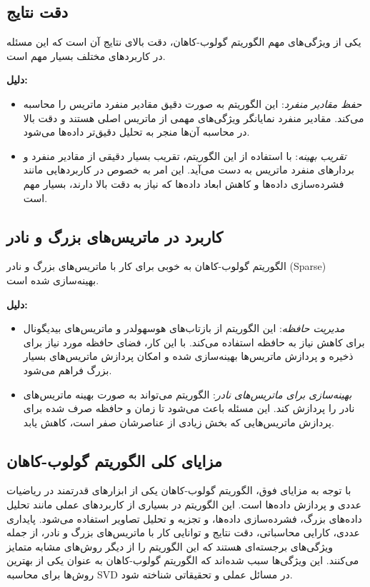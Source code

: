 \subsection{دقت نتایج}

یکی از ویژگی‌های مهم الگوریتم گولوب-کاهان، دقت بالای نتایج آن است که این مسئله در کاربردهای مختلف بسیار مهم است.

\textbf{دلیل:}

\begin{itemize}
  \item \textit{حفظ مقادیر منفرد}: این الگوریتم به صورت دقیق مقادیر منفرد ماتریس را محاسبه می‌کند. مقادیر منفرد نمایانگر ویژگی‌های مهمی از ماتریس اصلی هستند و دقت بالا در محاسبه آن‌ها منجر به تحلیل دقیق‌تر داده‌ها می‌شود.
  \item \textit{تقریب بهینه}: با استفاده از این الگوریتم، تقریب بسیار دقیقی از مقادیر منفرد و بردارهای منفرد ماتریس به دست می‌آید. این امر به خصوص در کاربردهایی مانند فشرده‌سازی داده‌ها و کاهش ابعاد داده‌ها که نیاز به دقت بالا دارند، بسیار مهم است.
\end{itemize}

\subsection{کاربرد در ماتریس‌های بزرگ و نادر}

الگوریتم گولوب-کاهان به خوبی برای کار با ماتریس‌های بزرگ و نادر (Sparse) بهینه‌سازی شده است.

\textbf{دلیل:}

\begin{itemize}
  \item \textit{مدیریت حافظه}: این الگوریتم از بازتاب‌های هوسهولدر و ماتریس‌های بیدیگونال برای کاهش نیاز به حافظه استفاده می‌کند. با این کار، فضای حافظه مورد نیاز برای ذخیره و پردازش ماتریس‌ها بهینه‌سازی شده و امکان پردازش ماتریس‌های بسیار بزرگ فراهم می‌شود.
  \item \textit{بهینه‌سازی برای ماتریس‌های نادر}: الگوریتم می‌تواند به صورت بهینه ماتریس‌های نادر را پردازش کند. این مسئله باعث می‌شود تا زمان و حافظه صرف شده برای پردازش ماتریس‌هایی که بخش زیادی از عناصرشان صفر است، کاهش یابد.
\end{itemize}

\subsection{مزایای کلی الگوریتم گولوب-کاهان}

با توجه به مزایای فوق، الگوریتم گولوب-کاهان یکی از ابزارهای قدرتمند در ریاضیات عددی و پردازش داده‌ها است. این الگوریتم در بسیاری از کاربردهای عملی مانند تحلیل داده‌های بزرگ، فشرده‌سازی داده‌ها، و تجزیه و تحلیل تصاویر استفاده می‌شود. پایداری عددی، کارایی محاسباتی، دقت نتایج و توانایی کار با ماتریس‌های بزرگ و نادر، از جمله ویژگی‌های برجسته‌ای هستند که این الگوریتم را از دیگر روش‌های مشابه متمایز می‌کنند. این ویژگی‌ها سبب شده‌اند که الگوریتم گولوب-کاهان به عنوان یکی از بهترین روش‌ها برای محاسبه SVD در مسائل عملی و تحقیقاتی شناخته شود.

